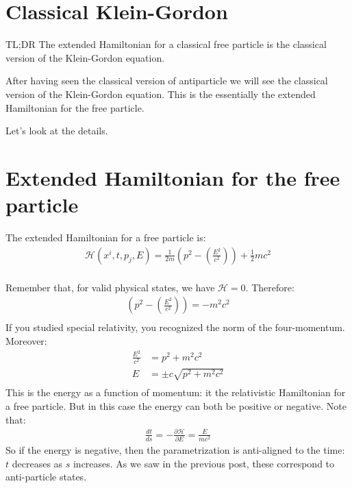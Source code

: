 \documentclass[aps,pra,10pt,floatfix,nofootinbib]{revtex4-1}
\theoremstyle{definition}
\begin{document}
\section{Classical Klein-Gordon}

TL;DR The extended Hamiltonian for a classical free particle is the classical version of the Klein-Gordon equation.

After having seen the classical version of antiparticle we will see the classical version of the Klein-Gordon equation. This is the essentially the extended Hamiltonian for the free particle.

Let's look at the details.

\section{Extended Hamiltonian for the free particle}

The extended Hamiltonian for a free particle is:
\begin{equation}
\begin{aligned}
\mathcal{H}(x^i,t,p_j,E) = \frac{1}{2m} \left(p^2 - \left(\frac{E^2}{c^2}\right)\right)  + \frac{1}{2} mc^2\\
\end{aligned}
\label{ExtendedHamiltonFree}
\end{equation}

Remember that, for valid physical states, we have $\mathcal{H}=0$. Therefore:
\begin{equation}
\begin{aligned}
\left(p^2 - \left(\frac{E^2}{c^2}\right)\right) = - m^2c^2\\
\end{aligned}
\label{FourMomentum}
\end{equation}
If you studied special relativity, you recognized the norm of the four-momentum. Moreover:
\begin{equation}
\begin{aligned}
\frac{E^2}{c^2} &= p^2 + m^2c^2\\
E &= \pm c \sqrt{p^2 + m^2c^2} \\
\end{aligned}
\label{HamiltonFree}
\end{equation}
This is the energy as a function of momentum: it the relativistic Hamiltonian for a free particle. But in this case the energy can both be positive or negative. Note that:
\begin{equation}
\begin{aligned}
\frac{dt}{ds} = - \frac{\partial \mathcal{H}}{\partial E} = \frac{E}{mc^2}
\end{aligned}
\label{TimeEvolution}
\end{equation}
So if the energy is negative, then the parametrization is anti-aligned to the time: $t$ decreases as $s$ increases. As we saw in the previous post, these correspond to anti-particle states.
\end{document}
